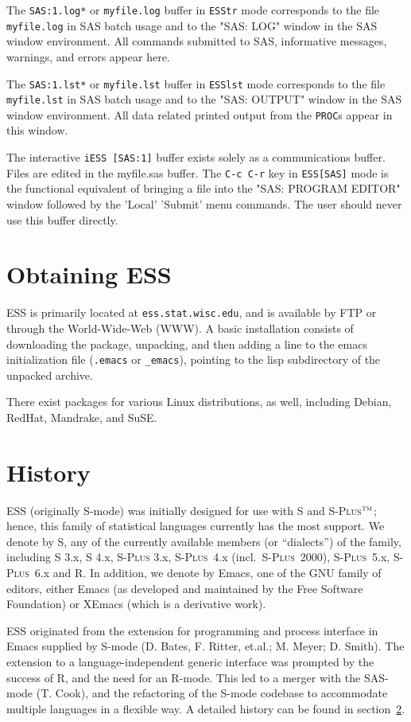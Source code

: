 \documentclass{article}
\newcommand*{\Splus}{\textsc{S-Plus}}
\newcommand{\tm}{$^{\mbox{\scriptsize\sc tm}}$}
\begin{document}
The {\tt *SAS:1.log*} or {\tt myfile.log} buffer in {\tt ESStr} mode
corresponds to the file {\tt myfile.log} in SAS batch usage and to the
"SAS: LOG" window in the SAS window environment.  All commands
submitted to SAS, informative messages, warnings, and errors appear
here.

The {\tt *SAS:1.lst*} or {\tt myfile.lst} buffer in {\tt ESSlst} mode
corresponds to the file {\tt myfile.lst} in SAS batch usage and to the
"SAS: OUTPUT" window in the SAS window environment.  All data related
printed output from the {\tt PROC}s appear in this window.

The interactive {\tt iESS [SAS:1]} buffer exists solely as a communications buffer.
Files are edited in the myfile.sas buffer.  The {\tt C-c C-r} key in
{\tt ESS[SAS]} mode is the functional equivalent of bringing a file into the
"SAS: PROGRAM EDITOR" window followed by the 'Local' 'Submit' menu
commands.  The user should never use this buffer directly.

\section{Obtaining ESS}
\label{sec:getIt}

ESS is primarily located at {\tt ess.stat.wisc.edu}, and is available by FTP
or through the World-Wide-Web (WWW).  A basic installation consists of
downloading the package, unpacking, and then adding a line to the
emacs initialization file (\verb+.emacs+ or \verb+_emacs+), pointing
to the lisp subdirectory of the unpacked archive.

There exist packages for various Linux distributions, as well,
including Debian, RedHat, Mandrake, and SuSE.

\section{History}
\label{sec:history}

ESS (originally S-mode) was initially designed for use with S and
\Splus\tm; hence, this family of statistical languages currently has
the most support.  We denote by S, any of the currently available
members (or ``dialects'') of the family, including S 3.x, S 4.x, \Splus
3.x, \Splus~4.x (incl.\ \Splus~2000), \Splus~5.x, \Splus~6.x and R.
In addition, we
denote by Emacs, one of the GNU family of editors, either Emacs (as
developed and maintained by the Free Software Foundation) or XEmacs (which
is a derivative work).

ESS originated from the extension for programming and process
interface in Emacs supplied by S-mode (D. Bates, F. Ritter, et.al.; 
M. Meyer; D. Smith).  The extension to a language-independent generic
interface was prompted by the success of R, and the need for an
R-mode.  This led to a merger with the SAS-mode (T. Cook), and the
refactoring of the S-mode codebase to accommodate multiple languages
in a flexible way.  A detailed history can be found in
section~\ref{sec:history}.
\end{document}
